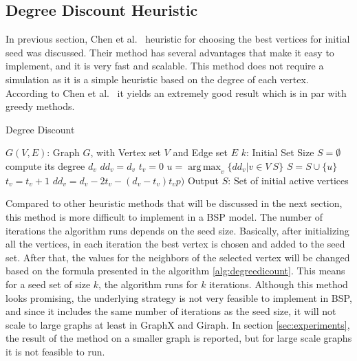 \documentclass[english]{tktltiki}
\DeclareMathOperator*{\argmax}{arg\,max}
\begin{document}
\subsection{Degree Discount Heuristic}
\label{subsec:degreediscount}
In previous section, Chen et al.\ \cite{chen09} heuristic for choosing the best vertices for initial seed was discussed. Their method has several advantages that make it easy to implement, and it is very fast and scalable. This method does not require a simulation as it is a simple heuristic based on the degree of each vertex. According to Chen et al.\ \cite{chen09} it yields an extremely good result which is in par with greedy methods.
\begin{algorithm}[ht!]
\caption{Degree Discount  \cite{chen09}}
\label{alg:degreedicount}
\begin{algorithmic}
\Require $G(V,E)$: Graph $G$, with Vertex set $V$ and Edge set $E$
\Require $k$: Initial Set Size
\State $S=\emptyset$
	\State compute its degree $d_v$
 	\State $dd_v=d_v$
 	\State $t_v = 0$
\EndFor
{}
	\State $u = \argmax_v \{dd_v |  v \in V \ S\}$
	\State $S = S \cup \{u\}$
		\State $t_v = t_v + 1$
		\State $dd_v = d_v - 2t_v - (d_v - t_v)t_v p)$
	\EndFor
\EndFor
\State Output $S$: Set of initial active vertices
\end{algorithmic}
\end{algorithm}
Compared to other heuristic methods that will be discussed in the next section, this method is more difficult to implement in a BSP model. The number of iterations the algorithm runs depends on the seed size. Basically, after initializing all the vertices, in each iteration the best vertex is chosen and added to the seed set. After that, the values for the neighbors of the selected vertex will be changed based on the formula presented in the algorithm \ref{alg:degreedicount}. This means for a seed set of size $k$, the algorithm runs for $k$ iterations. Although this method looks promising, the underlying strategy is not very feasible to implement in BSP, and since it includes the same number of iterations as the seed size, it will not scale to large graphs at least in GraphX and Giraph. In section \ref{sec:experiments}, the result of the method on a smaller graph is reported, but for large scale graphs it is not feasible to run.
\end{document}
